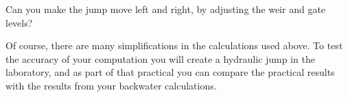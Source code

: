 \documentclass[a4paper]{article}
\begin{document}

\begin{exercise}
  Can you make the jump move left and right, by adjusting the weir and gate levels?
\end{exercise}

Of course, there are many simplifications in the calculations used above. To test the accuracy of your computation you will create a hydraulic jump in the laboratory, and as part of that practical you can compare the practical results with the results from your backwater calculations.

\printsolutions
\end{document}
